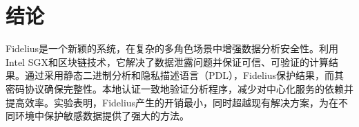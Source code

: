 \section{结论}\label{sec:conclude}
Fidelius是一个新颖的系统，在复杂的多角色场景中增强数据分析安全性。利用Intel SGX和区块链技术，它解决了数据泄露问题并保证可信、可验证的计算结果。通过采用静态二进制分析和隐私描述语言（PDL），Fidelius保护结果，而其密码协议确保完整性。本地认证一致地验证分析程序，减少对中心化服务的依赖并提高效率。实验表明，Fidelius产生的开销最小，同时超越现有解决方案，为在不同环境中保护敏感数据提供了强大的方法。 